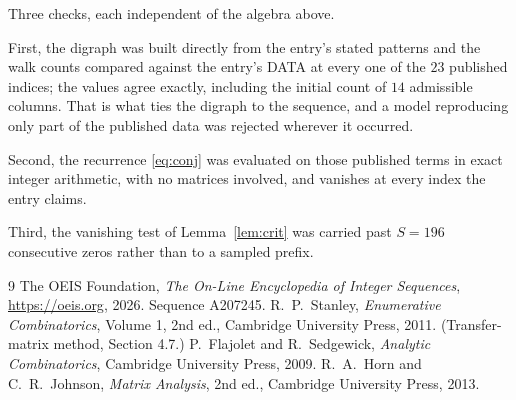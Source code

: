 \documentclass[11pt,a4paper]{article}
\theoremstyle{plain}
\theoremstyle{definition}
\begin{document}
Three checks, each independent of the algebra above.

First, the digraph was built directly from the entry's stated patterns and the walk counts
compared against the entry's DATA at every one of the $23$ published indices; the
values agree exactly, including the initial count of $14$ admissible columns. That is
what ties the digraph to the sequence, and a model reproducing only part of the published
data was rejected wherever it occurred.

Second, the recurrence \eqref{eq:conj} was evaluated on those published terms in exact
integer arithmetic, with no matrices involved, and vanishes at every index the entry claims.

Third, the vanishing test of Lemma~\ref{lem:crit} was carried past $S=196$ consecutive
zeros rather than to a sampled prefix.

\begin{thebibliography}{9}
 The OEIS Foundation, \emph{The On-Line Encyclopedia of Integer
Sequences}, \url{https://oeis.org}, 2026. Sequence A207245.
 R.~P.~Stanley, \emph{Enumerative Combinatorics}, Volume 1, 2nd ed.,
Cambridge University Press, 2011. (Transfer-matrix method, Section 4.7.)
 P.~Flajolet and R.~Sedgewick, \emph{Analytic Combinatorics}, Cambridge
University Press, 2009.
 R.~A.~Horn and C.~R.~Johnson, \emph{Matrix Analysis}, 2nd ed., Cambridge
University Press, 2013.
\end{thebibliography}
\end{document}
